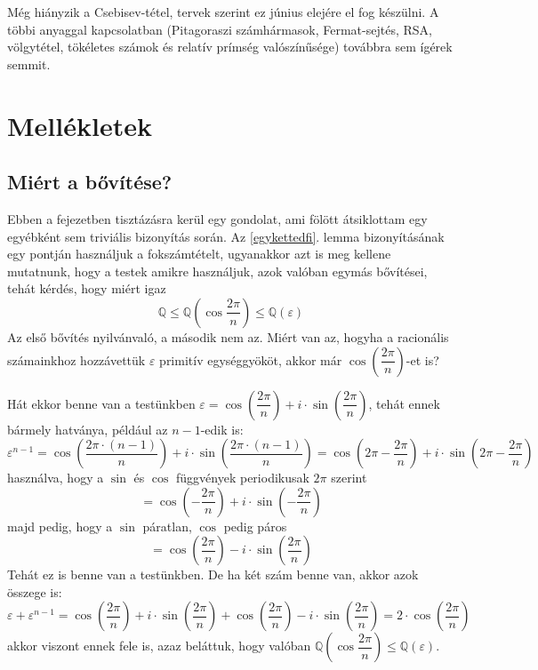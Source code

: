 \documentclass[12pt]{book}
\theoremstyle{plain} %
\theoremstyle{definition} %
\theoremstyle{remark}
\numberwithin{equation}{section}  %
\def\Q{\mathbb{Q}}
\begin{document}
	\color{red} Még hiányzik a Csebisev-tétel, tervek szerint ez június elejére el fog készülni. A többi anyaggal kapcsolatban (Pitagoraszi számhármasok, Fermat-sejtés, RSA, völgytétel, tökéletes számok és relatív prímség valószínűsége) továbbra sem ígérek semmit. \color{black}
	
	
	\chapter*{Mellékletek}
	\setcounter{chapter}{\thechapter+1}
	\setcounter{section}{0}
	\section{Miért a bővítése?}
	Ebben a fejezetben tisztázásra kerül egy gondolat, ami fölött átsiklottam egy egyébként sem triviális bizonyítás során. Az \ref{egykettedfi}. lemma bizonyításának egy pontján használjuk a fokszámtételt, ugyanakkor azt is meg kellene mutatnunk, hogy a testek amikre használjuk, azok valóban egymás bővítései, tehát kérdés, hogy miért igaz
	\[ \mathbb{Q} \leq \Q\left (\cos \dfrac{2\pi}{n} \right) \leq \Q(\varepsilon) \]
	Az első bővítés nyilvánvaló, a második nem az. Miért van az, hogyha a racionális számainkhoz hozzávettük $\varepsilon$ primitív egységgyököt, akkor már $\cos \left( \dfrac{2\pi}{n} \right) $-et is?
	
	Hát ekkor benne van a testünkben $\varepsilon =\cos \left( \dfrac{2\pi}{n} \right)+ i\cdot \sin \left( \dfrac{2\pi}{n} \right) $, tehát ennek bármely hatványa, például az $n-1$-edik is:
	\[ \varepsilon^{n-1} = \cos \left( \dfrac{2\pi \cdot (n-1)}{n} \right) + i\cdot \sin \left( \dfrac{2\pi \cdot (n-1)}{n} \right) = \cos \left( 2\pi - \dfrac{2\pi }{n} \right) + i\cdot \sin \left( 2\pi - \dfrac{2\pi}{n} \right)  \]
	használva, hogy a $\sin$ és $\cos$ függvények periodikusak $2\pi$ szerint
	\[ = \cos \left( - \dfrac{2\pi }{n} \right) + i\cdot \sin \left(- \dfrac{2\pi}{n} \right)   \]
	majd pedig, hogy a $\sin$ páratlan, $\cos$ pedig páros
	\[ = \cos \left(\dfrac{2\pi }{n} \right) - i\cdot \sin \left( \dfrac{2\pi}{n} \right) \]
	Tehát ez is benne van a testünkben. De ha két szám benne van, akkor azok összege is:
	\[ \varepsilon + \varepsilon^{n-1} = \cos \left(\dfrac{2\pi }{n} \right) + i\cdot \sin \left( \dfrac{2\pi}{n} \right) + \cos \left(\dfrac{2\pi }{n} \right) - i\cdot \sin \left( \dfrac{2\pi}{n} \right) = 2\cdot \cos \left(\dfrac{2\pi }{n} \right) \]
	akkor viszont ennek fele is, azaz beláttuk, hogy valóban $\Q \left( \cos \dfrac{2\pi }{n} \right) \leq \Q(\varepsilon)$.
	
\end{document}
